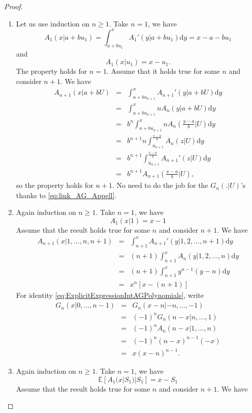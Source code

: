 \begin{proof}
\begin{enumerate}
  \item Let us use induction on $n\geq1$. Take $n = 1$, we have
  $$
  A_1(x|a + bu_1) = \int_{a+bu_1}^{x} A_1'(y|a+bu_1)\text{d}y = x - a - bu_1 
  $$
  and 
   $$
  A_1(x|u_1) = x-u_1.
  $$
  The property holds for $n = 1$. Assume that it holds true for some $n$ and consider $n+1$. We have
  \begin{eqnarray*}
  A_{n+1}(x|a+bU) &=& \int^{x}_{a+b u_{n+1}}A_{n+1}'(y|a+bU)\text{d}y\\
  &=& \int^{x}_{a+b u_{n+1}}nA_{n}(y|a+bU)\text{d}y\\
  &=&b^n\int^{x}_{a+b u_{n+1}}nA_{n}\left(\frac{y-a}{b}\Big|U\right)\text{d}y\\
  &=&b^{n+1}n\int^{\frac{x-a}{b}}_{u_{n+1}}A_{n}\left(z\Big|U\right)\text{d}y\\
  &=&b^{n+1}\int^{\frac{x-a}{b}}_{u_{n+1}}A_{n+1}'\left(z\Big|U\right)\text{d}y\\
  &=&b^{n+1}A_{n+1}\left(\frac{x-a}{b}\Big|U\right),
  \end{eqnarray*}
  so the property holds for $n+1$. No need to do the job for the $G_n(.|U)$'s thanks to \eqref{eq:link_AG_Appell}.
\item Again induction on $n\geq1$. Take $n = 1$, we have
$$
A_1(x|1) = x-1
$$
Assume that the result holds true for some $n$ and consider $n+1$. We have 
\begin{eqnarray*}
A_{n+1}(x|1,\ldots, n,n+1) &=& \int_{n+1}^{x}A_{n+1}'(y|1,2,\ldots, n+1)\text{d}y\\
&=& (n+1)\int_{n+1}^{x}A_{n}(y|1,2,\ldots, n)\text{d}y\\
&=& (n+1)\int_{n+1}^{x}y^{n-1}(y-n)\text{d}y\\
&=& x^n[x - (n + 1)]
\end{eqnarray*}
For identity \eqref{eq:ExplicitExpressionIntAGPolynomials}, write 
\begin{eqnarray*}
G_{n}(x|0,\ldots, n-1)&=&G_{n}(x-n|-n ,\ldots,-1)\\
&=&(-1)^nG_{n}(n-x|n,\ldots, 1)\\
&=&(-1)^nA_{n}(n-x|1,\ldots, n)\\
&=&(-1)^n(n-x)^{n-1}(-x)\\
&=&x(x-n)^{n-1}.
\end{eqnarray*}
\item Again induction on $n\geq1$. Take $n = 1$, we have
$$
\mathbb{E}[A_1(x|S_1)|S_1] = x-S_1
$$
Assume that the result holds true for some $n$ and consider $n+1$. We have 

\end{enumerate}
\end{proof}
